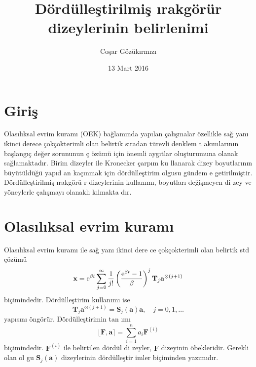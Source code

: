 \documentclass[a4paper,10pt]{article}
\title{D\"ord\"ulle\c{s}tirilmi\c{s} \i rakg\"or\"ur dizeylerinin 
belirlenimi}
\author{Co\c{s}ar G\"oz\"uk\i rm\i z{\i}}
\date{13 Mart 2016}
\begin{document}
\maketitle

\section{Giri\c{s}}

Olas\i l\i ksal evrim kuram{\i} (OEK) ba\u{g}lam\i nda yap\i lan %
\c{c}al\i \c{s}malar \"ozellikle sa\u{g} yan{\i} ikinci de\-rece %
\c{c}ok\c{c}okterimli olan belirtik s\i radan t\"urevli denklem t%
ak\i mlar\i n\i n ba\c{s}lang\i \c{c} de\u{g}er so\-rununun \c{c}%
\"oz\"um\"u i\c{c}in \"onemli ayg\i tlar olu\c{s}turumuna olanak %
sa\u{g}lamaktad\i r. Birim dizeyler ile Kronecker \c{c}arp\i m ku%
llanarak dizey boyutlar\i n\i n b\"uy\"ut\"uld\"u\u{g}\"u yap\i d%
an ka\c{c}\i nmak i\c{c}in d\"ord\"ulle\c{s}tirim olgusu g\"undem%
e getirilmi\c{s}tir. D\"ord\"ulle\c{s}tirilmi\c{s} \i rakg\"or\"u%
r dizeylerinin kullan\i m{\i}, boyutlar{\i} de\u{g}i\c{s}meyen di%
zey ve y\"oneylerle \c{c}al\i \c{s}may{\i} olanakl{\i} k\i lmakta%
d\i r.

\section{Olas\i l\i ksal evrim kuram{\i}}

Olas\i l\i ksal evrim kuram{\i} ile sa\u{g} yan{\i} ikinci de\-re%
ce \c{c}ok\c{c}okterimli olan belirtik std \c{c}\"oz\"um\"u %
\begin{equation}
\mathbf{x} = {\rm e}^{\beta t}
\sum\limits_{j=0}^{\infty}\frac{1}{j!}%
\left(\frac{{\rm e}^{\beta t}-1}{\beta}\right)^{j}%
\mathbf{T}_{j}
\mathbf{a}^{\otimes (j+1)}
\label{eq:XNCbh}
\end{equation}
bi\c{c}imindedir. D\"ord\"ulle\c{s}tirim kullan{\i}m{\i} ise %
\begin{equation}
 \mathbf{T}_{j} \mathbf{a}^{\otimes (j+1)} = 
 \mathbf{S}_{j}(\mathbf{a})
 \mathbf{a}, \quad j=0,1,\ldots
\label{eq:AN8En}
\end{equation}
yap\i s\i n{\i} \"ong\"or\"ur. D\"or\-d\"ul\-le\c{s}ti\-rimin tan%
\i m{\i} %
\begin{equation}
 \lfloor \mathbf{F} , \mathbf{a} \rceil = 
 \sum_{i=1}^{n} a_{i} \mathbf{F}^{(i)}
\label{eq:vWTnF}
\end{equation}
bi\c{c}imindedir. $\mathbf{F}^{(i)}$ ile belirtilen d\"ord\"ul di%
zeyler, $\mathbf{F}$ dizeyinin \"obekleridir. Ge\-rek\-li olan ol%
gu $\mathbf{S}_{j}(\mathbf{a})$ dizeylerinin d\"ord\"ulle\c{s}tir%
imler bi\c{c}iminden yaz\i m\i d\i r. %
\end{document}
